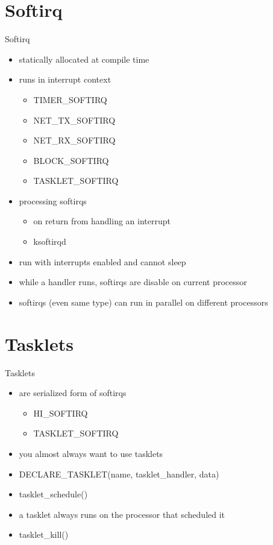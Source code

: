 \documentclass{workshop}
\begin{document}
\section{Softirq}
\begin{frame}{Softirq}
\begin{itemize}
\item statically allocated at compile time
\item runs in interrupt context
\begin{itemize}
\item TIMER_SOFTIRQ
\item NET_TX_SOFTIRQ
\item NET_RX_SOFTIRQ
\item BLOCK_SOFTIRQ
\item TASKLET_SOFTIRQ
\end{itemize}
\item processing softirqs
\begin{itemize}
\item on return from handling an interrupt
\item ksoftirqd
\end{itemize}
\item run with interrupts enabled and cannot sleep
\item while a handler runs, softirqs are disable on current processor
\item softirqs (even same type) can run in parallel on different processors
\end{itemize}
\end{frame}


\section{Tasklets}
\begin{frame}{Tasklets}
\begin{itemize}
\item are serialized form of softirqs
\begin{itemize}
\item HI_SOFTIRQ
\item TASKLET_SOFTIRQ
\end{itemize}
\item you almost always want to use tasklets
\item DECLARE_TASKLET(name, tasklet_handler, data)
\item tasklet_schedule()
\item a tasklet always runs on the processor that scheduled it
\item tasklet_kill()
\end{itemize}
\end{frame}
\end{document}
